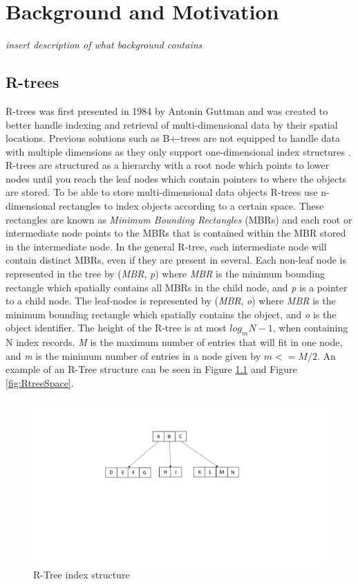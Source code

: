\chapter{Background and Motivation}
\label{chap:background}

\emph{insert description of what background contains}

\section{R-trees}
R-trees was first presented in 1984 by Antonin Guttman\cite{r-tree} and was created to better handle indexing and retrieval of multi-dimensional data by their spatial locations. Previous solutions such as B+-trees are not equipped to handle data with multiple dimensions as they only support one-dimensional index structures \cite{ComparisonOfAdvancedTree}. R-trees are structured as a hierarchy with a root node which points to lower nodes until you reach the leaf nodes which contain pointers to where the objects are stored. To be able to store multi-dimensional data objects R-trees use n-dimensional rectangles to index objects according to a certain space. These rectangles are known as \emph{Minimum Bounding Rectangles} (MBRs) and each root or intermediate node points to the MBRs that is contained within the MBR stored in the intermediate node. In the general R-tree, each intermediate node will contain distinct MBRs, even if they are present in several. Each non-leaf node is represented in the tree by (\emph{MBR},  \emph{p}) where \emph{MBR} is the minimum bounding rectangle which spatially contains all MBRs in the child node, and \emph{p} is a pointer to a child node. The leaf-nodes is represented by (\emph{MBR}, \emph{o}) where \emph{MBR} is the minimum bounding rectangle which spatially contains the object, and \emph{o} is the object identifier. The height of the R-tree is at most \(log_mN-1\), when containing N index records. \emph{M} is the maximum number of entries that will fit in one node, and \emph{m} is the minimum number of entries in a node given by \(m <= M/2\). An example of an R-Tree structure can be seen in Figure \ref{fig:RTree} and Figure \ref{fig:RtreeSpace}.



\begin{figure}[ht]
    \centering
    \includegraphics[scale=0.4]{figures/RTree.pdf}
    \caption{R-Tree index structure}
    \label{fig:RTree}
\end{figure}

